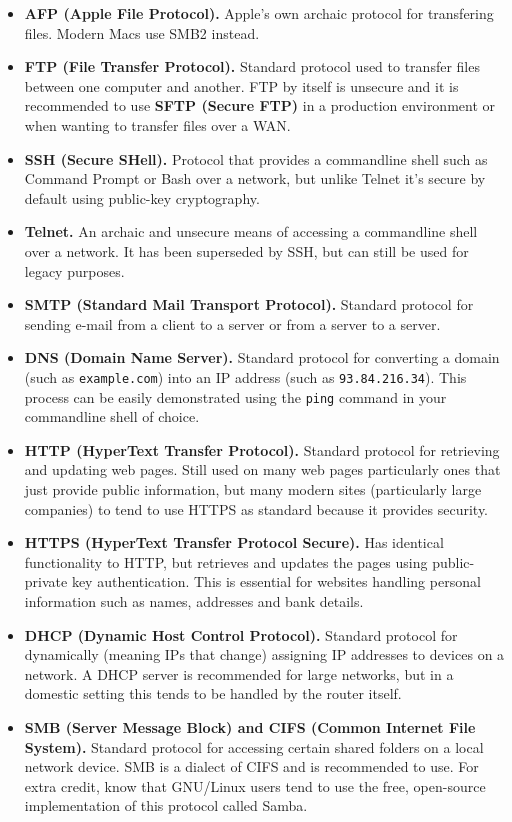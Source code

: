 \documentclass{article}
\begin{document}
\begin{itemize}
    \item \textbf{AFP (Apple File Protocol).} Apple's own archaic protocol for transfering files. Modern Macs use SMB2 instead.
    \item \textbf{FTP (File Transfer Protocol).} Standard protocol used to transfer files between one computer and another. FTP by itself is unsecure and it is recommended to use \textbf{SFTP (Secure FTP)} in a production environment or when wanting to transfer files over a WAN.
    \item \textbf{SSH (Secure SHell).} Protocol that provides a commandline shell such as Command Prompt or Bash over a network, but unlike Telnet it's secure by default using public-key cryptography.
    \item \textbf{Telnet.} An archaic and unsecure means of accessing a commandline shell over a network. It has been superseded by SSH, but can still be used for legacy purposes.
    \item \textbf{SMTP (Standard Mail Transport Protocol).} Standard protocol for sending e-mail from a client to a server or from a server to a server.
    \item \textbf{DNS (Domain Name Server).} Standard protocol for converting a domain (such as \texttt{example.com}) into an IP address (such as \texttt{93.84.216.34}). This process can be easily demonstrated using the \texttt{ping} command in your commandline shell of choice.
    \item \textbf{HTTP (HyperText Transfer Protocol).} Standard protocol for retrieving and updating web pages. Still used on many web pages particularly ones that just provide public information, but many modern sites (particularly large companies) to tend to use HTTPS as standard because it provides security.
    \item \textbf{HTTPS (HyperText Transfer Protocol Secure).} Has identical functionality to HTTP, but retrieves and updates the pages using public-private key authentication. This is essential for websites handling personal information such as names, addresses and bank details.
    \item \textbf{DHCP (Dynamic Host Control Protocol).} Standard protocol for dynamically (meaning IPs that change) assigning IP addresses to devices on a network. A DHCP server is recommended for large networks, but in a domestic setting this tends to be handled by the router itself.
    \item \textbf{SMB (Server Message Block) and CIFS (Common Internet File System).} Standard protocol for accessing certain shared folders on a local network device. SMB is a dialect of CIFS and is recommended to use. For extra credit, know that GNU/Linux users tend to use the free, open-source implementation of this protocol called Samba.

\end{itemize}
\end{document}
